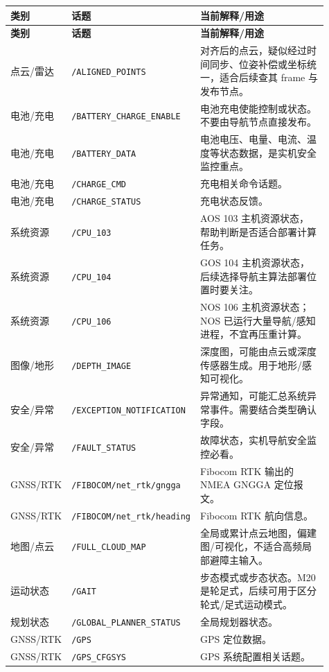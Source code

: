 \documentclass[UTF8,11pt,a4paper]{ctexart}
\begin{document}
{\small
\renewcommand{\arraystretch}{1.12}
\begin{longtable}{p{0.17\linewidth}p{0.31\linewidth}p{0.43\linewidth}}
\toprule
\textbf{类别} & \textbf{话题} & \textbf{当前解释/用途}\\
\midrule
\endfirsthead
\toprule
\textbf{类别} & \textbf{话题} & \textbf{当前解释/用途}\\
\midrule
\endhead
点云/雷达 & \texttt{/ALIGNED\_POINTS} & 对齐后的点云，疑似经过时间同步、位姿补偿或坐标统一，适合后续查其 frame 与发布节点。\\
电池/充电 & \texttt{/BATTERY\_CHARGE\_ENABLE} & 电池充电使能控制或状态。不要由导航节点直接发布。\\
电池/充电 & \texttt{/BATTERY\_DATA} & 电池电压、电量、电流、温度等状态数据，是实机安全监控重点。\\
电池/充电 & \texttt{/CHARGE\_CMD} & 充电相关命令话题。\\
电池/充电 & \texttt{/CHARGE\_STATUS} & 充电状态反馈。\\
系统资源 & \texttt{/CPU\_103} & AOS 103 主机资源状态，帮助判断是否适合部署计算任务。\\
系统资源 & \texttt{/CPU\_104} & GOS 104 主机资源状态，后续选择导航主算法部署位置时要关注。\\
系统资源 & \texttt{/CPU\_106} & NOS 106 主机资源状态；NOS 已运行大量导航/感知进程，不宜再压重计算。\\
图像/地形 & \texttt{/DEPTH\_IMAGE} & 深度图，可能由点云或深度传感器生成。用于地形/感知可视化。\\
安全/异常 & \texttt{/EXCEPTION\_NOTIFICATION} & 异常通知，可能汇总系统异常事件。需要结合类型确认字段。\\
安全/异常 & \texttt{/FAULT\_STATUS} & 故障状态，实机导航安全监控必看。\\
GNSS/RTK & \texttt{/FIBOCOM/net\_rtk/gngga} & Fibocom RTK 输出的 NMEA GNGGA 定位报文。\\
GNSS/RTK & \texttt{/FIBOCOM/net\_rtk/heading} & Fibocom RTK 航向信息。\\
地图/点云 & \texttt{/FULL\_CLOUD\_MAP} & 全局或累计点云地图，偏建图/可视化，不适合高频局部避障主输入。\\
运动状态 & \texttt{/GAIT} & 步态模式或步态状态。M20 是轮足式，后续可用于区分轮式/足式运动模式。\\
规划状态 & \texttt{/GLOBAL\_PLANNER\_STATUS} & 全局规划器状态。\\
GNSS/RTK & \texttt{/GPS} & GPS 定位数据。\\
GNSS/RTK & \texttt{/GPS\_CFGSYS} & GPS 系统配置相关话题。\\

\end{longtable}}
\end{document}
